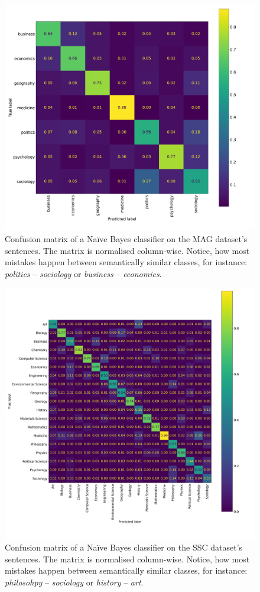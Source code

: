 \begin{figure}
    \centering
    \includegraphics[width=0.8\linewidth]{figures/mag-confusion.png}
    \captionsetup{width=.9\linewidth}
    \caption{Confusion matrix of a Naïve Bayes classifier on the MAG dataset's sentences. The matrix is normalised column-wise. Notice, how most mistakes happen between semantically similar classes, for instance: \textit{politics} -- \textit{sociology} or \textit{business} -- \textit{economics}.}
    \label{fig:mag-confusion}
\end{figure}

\begin{figure}
    \centering
    \includegraphics[width=\linewidth]{figures/ss-confusion.png}
    \captionsetup{width=.9\linewidth}
    \caption{Confusion matrix of a Naïve Bayes classifier on the SSC dataset's sentences. The matrix is normalised column-wise. Notice, how most mistakes happen between semantically similar classes, for instance:  \textit{philosohpy} -- \textit{sociology} or \textit{history} -- \textit{art}.}
    \label{fig:ss-confusion}
\end{figure}

